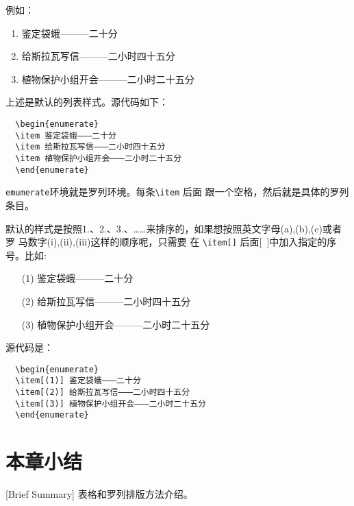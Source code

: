 例如：

\begin{enumerate}
\item 鉴定袋蛾———二十分
\item 给斯拉瓦写信———二小时四十五分
\item 植物保护小组开会———二小时二十五分
\end{enumerate}

上述是默认的列表样式。源代码如下：
\begin{lstlisting}
  \begin{enumerate}
  \item 鉴定袋蛾———二十分
  \item 给斯拉瓦写信———二小时四十五分
  \item 植物保护小组开会———二小时二十五分
  \end{enumerate}
\end{lstlisting}

\texttt{emumerate}环境就是罗列环境。每条\verb|\item| 后面
跟一个空格，然后就是具体的罗列条目。

默认的样式是按照1.、2.、3.、……来排序的，如果想按照英文字母(a),(b),(c)或者罗
马数字(i),(ii),(iii)这样的顺序呢，只需要
在 \verb|\item[]| 后面[~]中加入指定的序号。比如:
\begin{enumerate}
\item[(1)] 鉴定袋蛾———二十分
\item[(2)] 给斯拉瓦写信———二小时四十五分
\item[(3)] 植物保护小组开会———二小时二十五分
\end{enumerate}
源代码是：
\begin{lstlisting}
  \begin{enumerate}
  \item[(1)] 鉴定袋蛾———二十分
  \item[(2)] 给斯拉瓦写信———二小时四十五分
  \item[(3)] 植物保护小组开会———二小时二十五分
  \end{enumerate}
\end{lstlisting}

\section*{本章小结}[Brief Summary]
表格和罗列排版方法介绍。
